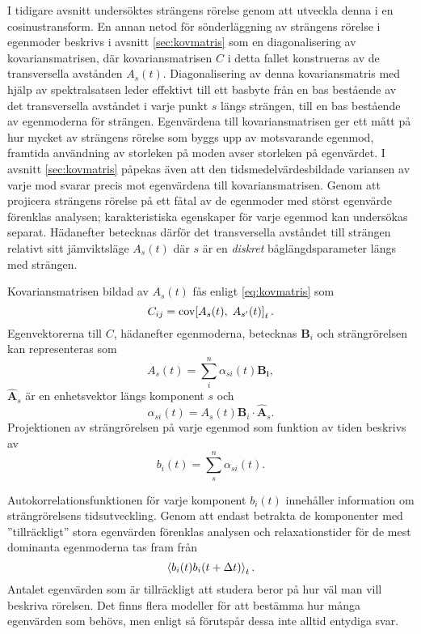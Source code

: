 I tidigare avsnitt undersöktes strängens rörelse genom att utveckla denna i en cosinustransform. En annan netod för sönderläggning av strängens rörelse i egenmoder beskrivs i avsnitt \ref{sec:kovmatris} som en diagonalisering av kovariansmatrisen, där kovariansmatrisen $C$ i detta fallet konstrueras av de transversella avstånden $A_s(t)$. Diagonalisering av denna kovariansmatris med hjälp av spektralsatsen leder effektivt till ett basbyte från en bas bestående av det transversella avståndet i varje punkt $s$ längs strängen, till en bas bestående av egenmoderna för strängen. Egenvärdena till kovariansmatrisen ger ett mått på hur mycket av strängens rörelse som byggs upp av motsvarande egenmod, framtida användning av storleken på moden avser storleken på egenvärdet. I avsnitt \ref{sec:kovmatris} påpekas även att den tidsmedelvärdesbildade variansen av varje mod svarar precis mot egenvärdena till kovariansmatrisen. Genom att projicera strängens rörelse på ett fåtal av de egenmoder med störst egenvärde förenklas analysen\cite{Shlens_PCA2014}; karakteristiska egenskaper för varje egenmod kan undersökas separat. Hädanefter betecknas därför det transversella avståndet till strängen relativt sitt jämviktsläge $A_s(t)$ där $s$ är en \emph{diskret} båglängdsparameter längs med strängen.

Kovariansmatrisen bildad av $A_s(t)$ fås enligt \eqref{eq:kovmatris} som 
\begin{equation}
\label{eq:C}
    C_{ij} = \text{cov}\!\left[A_s(t),\;A_{s'}(t)\right]_t.
\end{equation}
Egenvektorerna till $C$, hädanefter egenmoderna, betecknas $\mathbf{B}_i$ och strängrörelsen kan representeras som
\begin{equation}
    A_s(t) = \sum_i^n \alpha_{si}(t)\mathbf{B_i},
\end{equation}
$\hat{\mathbf{A}}_s$ är en enhetsvektor längs komponent $s$ och 
\begin{equation}
    \alpha_{si}(t) = A_s(t)\mathbf{B}_i\cdot\hat{\mathbf{A}}_s.
\end{equation}
Projektionen av strängrörelsen på varje egenmod som funktion av tiden beskrivs av
\begin{equation}
    b_i(t) = \sum_s^n \alpha_{si}(t).
\end{equation}

Autokorrelationsfunktionen för varje komponent $b_i(t)$ innehåller information om strängrörelsens tidsutveckling. Genom att endast betrakta de komponenter med ''tillräckligt'' stora egenvärden förenklas analysen och relaxationstider för de mest dominanta egenmoderna tas fram från 
\begin{equation}
\label{eq:korrmoder}
    \ev{b_i(t)b_i(t+\Delta t)}_t.
\end{equation}
Antalet egenvärden som är tillräckligt att studera beror på hur väl man vill beskriva rörelsen. Det finns flera modeller för att bestämma hur många egenvärden som behövs, men enligt \cite{Cangelosi2007} så förutspår dessa inte alltid entydiga svar. 


